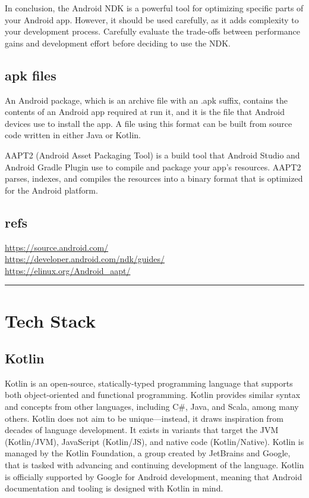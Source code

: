 \documentclass[12pt,oneside]{book}
\begin{document}
In conclusion, the Android NDK is a powerful tool for optimizing specific parts of your Android app. However, it should be used carefully, as it adds complexity to your development process. Carefully evaluate the trade-offs between performance gains and development effort before deciding to use the NDK.

    \section{apk files}
An Android package, which is an archive file with an .apk suffix, contains the contents of an Android app required at run it, and it is the file that Android devices use to install the app. A file using this format can be built from source code written in either Java or Kotlin.

AAPT2 (Android Asset Packaging Tool) is a build tool that Android Studio and Android Gradle Plugin use to compile and package your app's resources. AAPT2 parses, indexes, and compiles the resources into a binary format that is optimized for the Android platform.
\vfill

    \section*{refs} 
    \url{https://source.android.com/} \\
    \url{https://developer.android.com/ndk/guides/} \\
    \url{https://elinux.org/Android_aapt/}
\rule{\textwidth}{0.4pt}

\chapter{Tech Stack}
    \section{Kotlin}
Kotlin is an open-source, statically-typed programming language that supports both object-oriented and functional programming. Kotlin provides similar syntax and concepts from other languages, including C\#, Java, and Scala, among many others. Kotlin does not aim to be unique—instead, it draws inspiration from decades of language development. It exists in variants that target the JVM (Kotlin/JVM), JavaScript (Kotlin/JS), and native code (Kotlin/Native).
Kotlin is managed by the Kotlin Foundation, a group created by JetBrains and Google, that is tasked with advancing and continuing development of the language. Kotlin is officially supported by Google for Android development, meaning that Android documentation and tooling is designed with Kotlin in mind.
\end{document}
